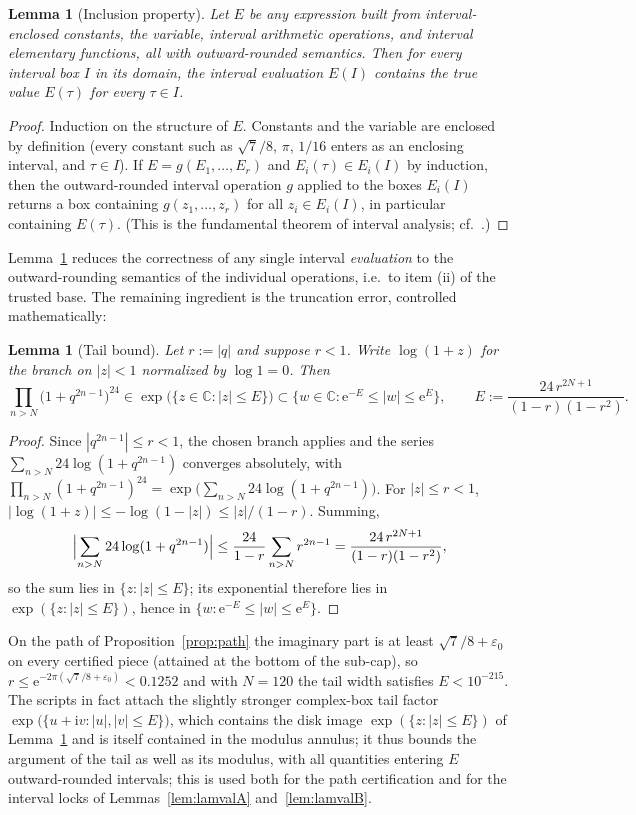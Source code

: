 \documentclass[11pt]{article}
\newtheorem{lemma}[theorem]{Lemma}
\theoremstyle{definition}
\theoremstyle{remark}
\newcommand{\Cc}{\mathbb{C}}
\newcommand{\ii}{\mathrm{i}}
\newcommand{\e}{\mathrm{e}}
\begin{document}
\begin{lemma}[Inclusion property]\label{lem:incl}
Let $E$ be any expression built from interval-enclosed constants, the
variable, interval arithmetic operations, and interval elementary
functions, all with outward-rounded semantics. Then for every interval
box $I$ in its domain, the interval evaluation $E(I)$ contains the true
value $E(\tau)$ for every $\tau\in I$.
\end{lemma}
\begin{proof}
Induction on the structure of $E$. Constants and the variable are
enclosed by definition (every constant such as $\sqrt7/8$, $\pi$, $1/16$
enters as an enclosing interval, and $\tau\in I$). If
$E=g(E_1,\dots,E_r)$ and $E_i(\tau)\in E_i(I)$ by induction, then the
outward-rounded interval operation $g$ applied to the boxes $E_i(I)$
returns a box containing $g(z_1,\dots,z_r)$ for all $z_i\in E_i(I)$, in
particular containing $E(\tau)$. (This is the fundamental theorem of
interval analysis; cf.\ \cite{MoKC}.)
\end{proof}

Lemma~\ref{lem:incl} reduces the correctness of any single interval
\emph{evaluation} to the outward-rounding semantics of the individual
operations, i.e.\ to item (ii) of the trusted base. The remaining
ingredient is the truncation error, controlled mathematically:

\begin{lemma}[Tail bound]\label{lem:tail}
Let $r:=|q|$ and suppose $r<1$. Write $\log(1+z)$ for the branch on
$|z|<1$ normalized by $\log 1=0$. Then
\[
  \prod_{n>N}\bigl(1+q^{2n-1}\bigr)^{24}
  \in \exp\bigl(\{z\in\Cc:|z|\le E\}\bigr)
  \subset\bigl\{w\in\Cc:\e^{-E}\le|w|\le\e^{E}\bigr\},\qquad
  E:=\frac{24\,r^{2N+1}}{(1-r)(1-r^2)}.
\]
\end{lemma}
\begin{proof}
Since $|q^{2n-1}|\le r<1$, the chosen branch applies and the series
$\sum_{n>N}24\log(1+q^{2n-1})$ converges absolutely, with
$\prod_{n>N}(1+q^{2n-1})^{24}=\exp\bigl(\sum_{n>N}24\log(1+q^{2n-1})\bigr)$.
For $|z|\le r<1$,
$|\log(1+z)|\le-\log(1-|z|)\le |z|/(1-r)$. Summing,
\[
  \Bigl|\sum_{n>N}24\log(1+q^{2n-1})\Bigr|
  \le\frac{24}{1-r}\sum_{n>N}r^{2n-1}
  =\frac{24\,r^{2N+1}}{(1-r)(1-r^2)},
\]
so the sum lies in $\{z:|z|\le E\}$; its exponential therefore lies
in $\exp(\{z:|z|\le E\})$, hence in
$\{w:\e^{-E}\le|w|\le\e^{E}\}$. \qedhere
\end{proof}

On the path of Proposition~\ref{prop:path} the imaginary part is at
least $\sqrt7/8+\varepsilon_0$ on every certified piece (attained at
the bottom of the sub-cap), so
$r\le\e^{-2\pi(\sqrt7/8+\varepsilon_0)}<0.1252$ and with $N=120$ the
tail width satisfies $E<10^{-215}$. The
scripts in fact attach the slightly stronger complex-box tail factor
$\exp\bigl(\{u+\ii v:|u|,|v|\le E\}\bigr)$, which contains the disk
image $\exp(\{z:|z|\le E\})$ of Lemma~\ref{lem:tail} and is itself
contained in the modulus annulus; it thus bounds the argument of the
tail as well as its modulus, with all quantities entering $E$
outward-rounded intervals; this is used both for the path certification
and for the interval locks of Lemmas~\ref{lem:lamvalA}
and~\ref{lem:lamvalB}.
\end{document}
